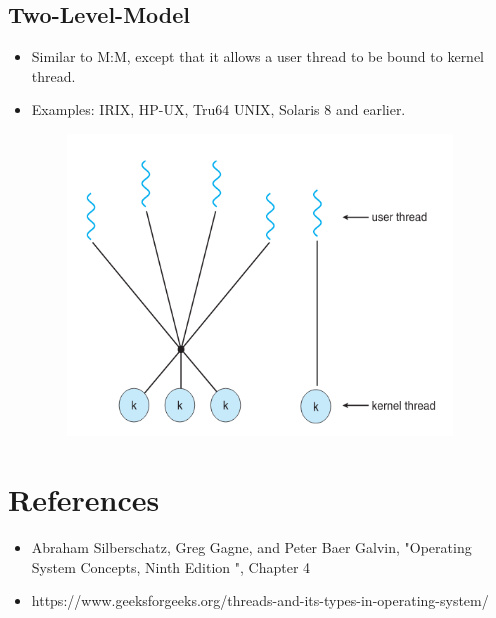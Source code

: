 \documentclass[12pt]{extarticle}
\begin{document}
\newpage

\subsection{Two-Level-Model}

\begin{itemize}
    \item Similar to M:M, except that it allows a user thread to be bound to kernel thread.
    \item Examples: IRIX, HP-UX, Tru64 UNIX, Solaris 8 and earlier.
\end{itemize}

\begin{center}

    \includegraphics[width=15cm, height=8cm]{two-level}
     
\end{center} 

\section{References}
\begin{itemize}
    \item Abraham Silberschatz, Greg Gagne, and Peter Baer Galvin, "Operating System Concepts, Ninth Edition ", Chapter 4 
    \item https://www.geeksforgeeks.org/threads-and-its-types-in-operating-system/
\end{itemize}
\end{document}
